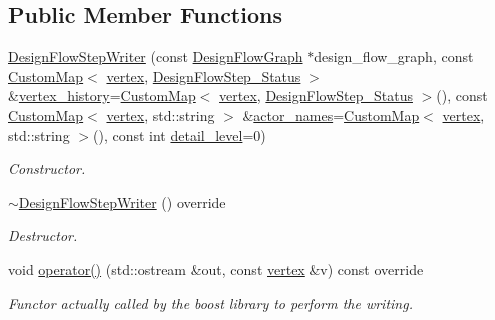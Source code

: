 \subsection*{Public Member Functions}
\begin{DoxyCompactItemize}
\item 
\hyperlink{classDesignFlowStepWriter_a294213703960582d00bfde4210650605}{Design\+Flow\+Step\+Writer} (const \hyperlink{classDesignFlowGraph}{Design\+Flow\+Graph} $\ast$design\+\_\+flow\+\_\+graph, const \hyperlink{custom__map_8hpp_a18ca01763abbe3e5623223bfe5aaac6b}{Custom\+Map}$<$ \hyperlink{graph_8hpp_abefdcf0544e601805af44eca032cca14}{vertex}, \hyperlink{design__flow__step_8hpp_afb1f0d73069c26076b8d31dbc8ebecdf}{Design\+Flow\+Step\+\_\+\+Status} $>$ \&\hyperlink{classDesignFlowStepWriter_af972e0108493754493763d0451405483}{vertex\+\_\+history}=\hyperlink{custom__map_8hpp_a18ca01763abbe3e5623223bfe5aaac6b}{Custom\+Map}$<$ \hyperlink{graph_8hpp_abefdcf0544e601805af44eca032cca14}{vertex}, \hyperlink{design__flow__step_8hpp_afb1f0d73069c26076b8d31dbc8ebecdf}{Design\+Flow\+Step\+\_\+\+Status} $>$(), const \hyperlink{custom__map_8hpp_a18ca01763abbe3e5623223bfe5aaac6b}{Custom\+Map}$<$ \hyperlink{graph_8hpp_abefdcf0544e601805af44eca032cca14}{vertex}, std\+::string $>$ \&\hyperlink{classDesignFlowStepWriter_a4e5109313c00181d72cb6a260340bfc9}{actor\+\_\+names}=\hyperlink{custom__map_8hpp_a18ca01763abbe3e5623223bfe5aaac6b}{Custom\+Map}$<$ \hyperlink{graph_8hpp_abefdcf0544e601805af44eca032cca14}{vertex}, std\+::string $>$(), const int \hyperlink{classVertexWriter_aa22b6ea9c9a75b7fce3767b00e08ed3f}{detail\+\_\+level}=0)
\begin{DoxyCompactList}\small\item\em Constructor. \end{DoxyCompactList}\item 
\hyperlink{classDesignFlowStepWriter_a0eb543f9955460c35494103145c8080f}{$\sim$\+Design\+Flow\+Step\+Writer} () override
\begin{DoxyCompactList}\small\item\em Destructor. \end{DoxyCompactList}\item 
void \hyperlink{classDesignFlowStepWriter_a0d8ca8f65142a1331981d839462d8395}{operator()} (std\+::ostream \&out, const \hyperlink{graph_8hpp_abefdcf0544e601805af44eca032cca14}{vertex} \&v) const override
\begin{DoxyCompactList}\small\item\em Functor actually called by the boost library to perform the writing. \end{DoxyCompactList}\end{DoxyCompactItemize}
